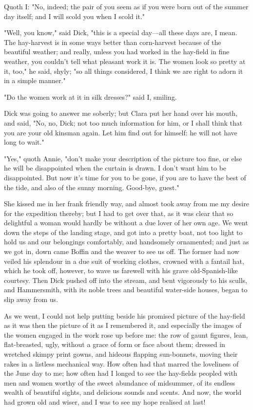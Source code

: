 Quoth I: "No, indeed; the pair of you seem as if you were born out of
the summer day itself; and I will scold you when I scold it."

"Well, you know," said Dick, "this is a special day---all these days
are, I mean. The hay-harvest is in some ways better than corn-harvest
because of the beautiful weather; and really, unless you had worked in
the hay-field in fine weather, you couldn't tell what pleasant work it
is. The women look so pretty at it, too," he said, shyly; "so all things
considered, I think we are right to adorn it in a simple manner."

"Do the women work at it in silk dresses?" said I, smiling.

Dick was going to answer me soberly; but Clara put her hand over his
mouth, and said, "No, no, Dick; not too much information for him, or I
shall think that you are your old kinsman again. Let him find out for
himself: he will not have long to wait."

"Yes," quoth Annie, "don't make your description of the picture too
fine, or else he will be disappointed when the curtain is drawn. I don't
want him to be disappointed. But now it's time for you to be gone, if
you are to have the best of the tide, and also of the sunny morning.
Good-bye, guest."

She kissed me in her frank friendly way, and almost took away from me my
desire for the expedition thereby; but I had to get over that, as it was
clear that so delightful a woman would hardly be without a due lover of
her own age. We went down the steps of the landing stage, and got into a
pretty boat, not too light to hold us and our belongings comfortably,
and handsomely ornamented; and just as we got in, down came Boffin and
the weaver to see us off. The former had now veiled his splendour in a
due suit of working clothes, crowned with a fantail hat, which he took
off, however, to wave us farewell with his grave old-Spanish-like
courtesy. Then Dick pushed off into the stream, and bent vigorously to
his sculls, and Hammersmith, with its noble trees and beautiful
water-side houses, began to slip away from us.

As we went, I could not help putting beside his promised picture of the
hay-field as it was then the picture of it as I remembered it, and
especially the images of the women engaged in the work rose up before
me: the row of gaunt figures, lean, flat-breasted, ugly, without a grace
of form or face about them; dressed in wretched skimpy print gowns, and
hideous flapping sun-bonnets, moving their rakes in a listless
mechanical way. How often had that marred the loveliness of the June day
to me; how often had I longed to see the hay-fields peopled with men and
women worthy of the sweet abundance of midsummer, of its endless wealth
of beautiful sights, and delicious sounds and scents. And now, the world
had grown old and wiser, and I was to see my hope realised at last!
